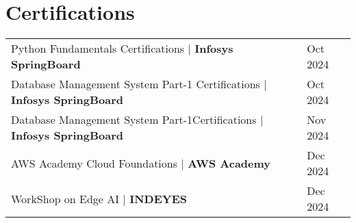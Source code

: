 \documentclass[a4paper,12pt]{article}
\begin{document}
 
\section{Certifications}
\begin{tabularx}{\linewidth}{@{}l X@{}}	
Python Fundamentals Certifications | \textbf{Infosys SpringBoard} &\hfill Oct 2024\\
Database Management System  Part-1 Certifications | \textbf{Infosys SpringBoard} &\hfill Oct 2024\\
Database Management System  Part-1Certifications | \textbf{Infosys SpringBoard} &\hfill Nov 2024\\
AWS Academy Cloud Foundations | \textbf{AWS Academy} &\hfill Dec 2024\\
WorkShop on Edge AI | \textbf{INDEYES} &\hfill Dec 2024\\
\end{tabularx}
\end{document}
